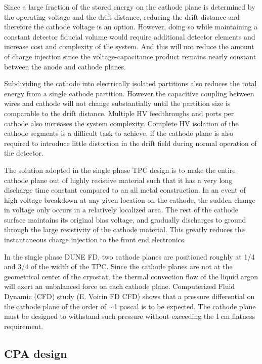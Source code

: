 Since  a large fraction of the stored energy on the cathode plane is determined by the operating voltage and the drift distance, reducing the drift distance and therefore the cathode voltage is an option.  However, doing so while maintaining a constant detector fiducial volume would require additional detector elements and increase cost and complexity of the system.  And this will not reduce the amount of charge injection since the voltage-capacitance product remains nearly constant between the anode and cathode planes.

Subdividing the cathode into electrically isolated partitions also reduces the total energy from a single cathode partition. However the capacitive coupling between wires and cathode will not change substantially until the partition size is comparable to the drift distance. Multiple HV feedthroughs and ports per cathode also increases the system complexity. Complete HV isolation of the cathode segments is a difficult task to achieve, if the cathode plane is also required to introduce little distortion in the drift field during normal operation of the detector. 

The solution adopted in the single phase TPC design is to make the entire cathode plane out of highly resistive material such that it has a very long discharge time constant compared to an all metal construction.  In an event of high voltage breakdown at any given location on the cathode, the sudden change in voltage only occurs in a relatively localized area.  The rest of the cathode surface maintains its original bias voltage, and gradually discharges to ground through the large resistivity of the cathode material.  This greatly reduces the instantaneous charge injection to the front end electronics.

In the single phase DUNE FD, two cathode planes are positioned roughly at 1/4 and 3/4 of the width of the TPC.  Since the cathode planes are not at the geometrical center of the cryostat, the thermal convection flow of the liquid argon will exert an unbalanced force on each cathode plane. Computerized Fluid Dynamic (CFD) study (E. Voirin FD CFD)  shows that a pressure differential on the cathode plane of the order of $\sim$1 pascal is to be expected.  The cathode plane must be designed to withstand such pressure without exceeding the 1\,cm flatness requirement.




\subsection{CPA design}

